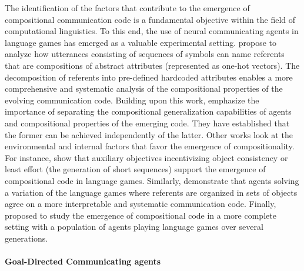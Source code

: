 The identification of the factors that contribute to the emergence of compositional communication code is a fundamental objective within the field of computational linguistics. To this end, the use of neural communicating agents in language games has emerged as a valuable experimental setting. \citet{kottur2017natural} propose to analyze how utterances consisting of sequences of symbols can name referents that are compositions of abstract attributes (represented as one-hot vectors). The decomposition of referents into pre-defined hardcoded attributes enables a more comprehensive and systematic analysis of the compositional properties of the evolving communication code. Building upon this work, \citet{chaabouni2020compositionality} emphasize the importance of separating the compositional generalization capabilities of agents and compositional properties of the emerging code. They have established that the former can be achieved independently of the latter. Other works look at the environmental and internal factors that favor the emergence of compositionality. For instance, \citet{rodriguez-luna-etal-2020-internal} show that auxiliary objectives incentivizing object consistency or least effort (the generation of short sequences) support the emergence of compositional code in language games. Similarly, \citet{mu2021emergent} demonstrate that agents solving a variation of the language games where referents are organized in sets of objects agree on a more interpretable and systematic communication code. Finally, \citet{Ren2020Compositional} proposed to study the emergence of compositional code in a more complete setting with a population of agents playing language games over several generations.

\paragraph{Goal-Directed Communicating agents}

